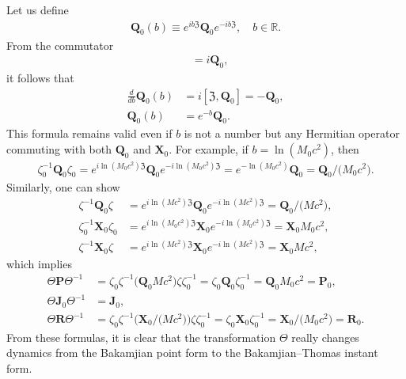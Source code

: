\documentclass[]{stefan1}
\begin{document}
Let us define
%
\begin{align*}
\boldsymbol{Q}_{0}(b) \equiv e^{i b \mathfrak{Z}} \boldsymbol{Q}_{0}
e ^{-i b
\mathfrak{Z}}, \quad  b \in \mathbb{R}.
\end{align*}
From the commutator
%
\begin{align*}
[\mathfrak{Z}, \boldsymbol{Q}_{0}] &= i \boldsymbol{Q}_{0},
\end{align*}
it follows that
%
\begin{align*}
\frac{d}{db} \boldsymbol{Q}_{0}(b) &= i [\mathfrak{Z},
\boldsymbol{Q} _{0}] = - \boldsymbol{Q}_{0},
\\
\boldsymbol{Q}_{0}(b) &= e^{- b}\boldsymbol{Q}_{0}.
\end{align*}
This formula remains valid even if $b$ is not a number but any Hermitian
operator commuting with both $\boldsymbol{Q}_{0}$ and $\boldsymbol{X}
_{0}$. For example, if $b = \ln  ( M_{0}c^{2} ) $, then
%
\begin{align*}
\zeta_{0}^{-1}\boldsymbol{Q}_{0}
\zeta_{0} = e^{i \ln  ( M_{0}c
^{2} )  \mathfrak{Z}} \boldsymbol{Q}_{0}
e^{-i
\ln  ( M_{0}c
^{2} )  \mathfrak{Z}} = e^{- \ln  ( M_{0}c^{2} ) } \boldsymbol{Q}_{0} =
\boldsymbol{Q}_{0}/ \bigl( M_{0}c^{2} \bigr) .
\end{align*}
Similarly, one can show
%
\begin{align*}
\zeta^{-1}\boldsymbol{Q}_{0} \zeta &= e^{i \ln  ( Mc^{2} )
\mathfrak{Z}}
\boldsymbol{Q}_{0} e^{-i
\ln  ( Mc^{2} )
\mathfrak{Z}} = \boldsymbol{Q}_{0}/
\bigl( Mc^{2} \bigr) ,
\\
\zeta_{0}^{-1}\boldsymbol{X}_{0}
\zeta_{0} &= e^{i \ln  ( M_{0}c
^{2} )  \mathfrak{Z}} \boldsymbol{X}_{0}
e^{-i
\ln  ( M_{0}c
^{2} )  \mathfrak{Z}} = \boldsymbol{X}_{0}M_{0}c^{2},
\\
\zeta^{-1}\boldsymbol{X}_{0} \zeta &= e^{i \ln  ( Mc^{2} )
\mathfrak{Z}}
\boldsymbol{X}_{0} e^{-i
\ln  ( Mc^{2} )
\mathfrak{Z}} = \boldsymbol{X}_{0}Mc^{2},
\end{align*}
which implies
%
\begin{align*}
\Theta \boldsymbol{P} \Theta^{-1} &= \zeta_{0}
\zeta^{-1} \bigl( \boldsymbol{Q} _{0} Mc^{2}
\bigr) \zeta \zeta_{0}^{-1} = \zeta_{0}
\boldsymbol{Q} _{0} \zeta_{0}^{-1} =
\boldsymbol{Q}_{0} M_{0}c^{2} =\boldsymbol{P}
_{0},
\\
\Theta \boldsymbol{J}_{0} \Theta^{-1} &=
\boldsymbol{J}_{0},
\\
\Theta \boldsymbol{R} \Theta^{-1} &= \zeta_{0}
\zeta^{-1} \bigl( \boldsymbol{X} _{0} / \bigl(
Mc^{2} \bigr) \bigr) \zeta \zeta_{0}^{-1} =
\zeta_{0} \boldsymbol{X}_{0} \zeta_{0}^{-1}
= \boldsymbol{X}_{0} / \bigl( M_{0}c ^{2} \bigr)
= \boldsymbol{R}_{0}.
\end{align*}
From these formulas, it is clear that the transformation $ \Theta $
really changes dynamics from the Bakamjian point form to the
Bakamjian--Thomas instant form.
\end{document}
